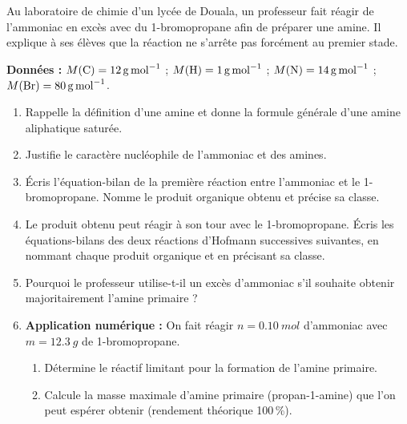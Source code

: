 \documentclass[11pt]{article}
\begin{document}
\begin{exercice}
Au laboratoire de chimie d'un lycée de Douala, un professeur fait réagir de l'ammoniac  en excès avec du 1-bromopropane  afin de préparer une amine. Il explique à ses élèves que la réaction ne s'arrête pas forcément au premier stade.

\medskip
\textbf{Données :} $M(\ce{C}) = \SI{12}{g.mol^{-1}}$ ; $M(\ce{H}) = \SI{1}{g.mol^{-1}}$ ; $M(\ce{N}) = \SI{14}{g.mol^{-1}}$ ; $M(\ce{Br}) = \SI{80}{g.mol^{-1}}$.
\begin{enumerate}
\item Rappelle la définition d'une amine et donne la formule générale d'une amine aliphatique saturée.
\item Justifie le caractère nucléophile de l'ammoniac et des amines.
\item Écris l'équation-bilan de la première réaction entre l'ammoniac et le 1-bromopropane. Nomme le produit organique obtenu et précise sa classe.
\item Le produit obtenu peut réagir à son tour avec le 1-bromopropane. Écris les équations-bilans des deux réactions d'Hofmann successives suivantes, en nommant chaque produit organique et en précisant sa classe.
\item Pourquoi le professeur utilise-t-il un excès d'ammoniac s'il souhaite obtenir majoritairement l'amine primaire ?
\item \textbf{Application numérique :} On fait réagir $n = \SI{0,10}{mol}$ d'ammoniac avec $m = \SI{12,3}{g}$ de 1-bromopropane. 
\begin{enumerate}
\item Détermine le réactif limitant pour la formation de l'amine primaire.
\item Calcule la masse maximale d'amine primaire (propan-1-amine) que l'on peut espérer obtenir (rendement théorique 100\,\%).
\end{enumerate}
\end{enumerate}
\end{exercice}
\end{document}
